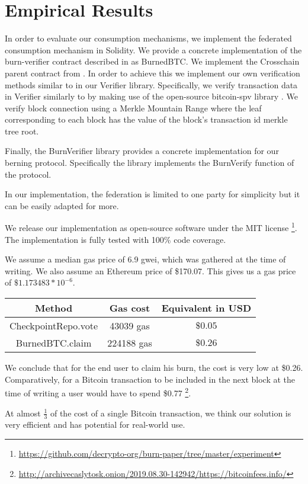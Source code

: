 \section{Empirical Results}

\newcommand{\rref}[1]{}

In order to evaluate our consumption mechanisms, we implement the federated consumption mechanism in Solidity. We provide a concrete implementation of the \textsf{burn-verifier} contract described in \rref{alg.burn-verifier} as \textsf{BurnedBTC}. We implement the \textsf{Crosschain} parent contract from \cite{pow-sidechains}. In order to achieve this we implement our own verification methods similar to \rref{alg.verify-event-federation} in our \textsf{Verifier} library. Specifically, we verify transaction data in \textsf{Verifier} similarly to \rref{alg.verify-tx} by making use of the open-source bitcoin-spv library \cite{bitcoin-spv-library}. We verify block connection using a Merkle Mountain Range where the leaf corresponding to each block has the value of the block's transaction id merkle tree root.

Finally, the \textsf{BurnVerifier} library provides a concrete implementation for our berning protocol. Specifically the library implements the \textsf{BurnVerify} function of the protocol.

In our implementation, the federation is limited to one party for simplicity but it can be easily adapted for more.

We release our implementation as open-source software under the MIT license
\footnote{\url{https://github.com/decrypto-org/burn-paper/tree/master/experiment}}.
The implementation is fully tested with 100\% code coverage.

We assume a median gas price of 6.9 gwei, which was gathered at the time of writing. We also assume an Ethereum price of \$170.07. This gives us a gas price of $\$1.173483 * 10^{-6}$.

\begin{center}
    \begin{tabular}{ |c|c|c| } 
     \hline
     Method & Gas cost & Equivalent in USD \\
     \hline
     \textsf{CheckpointRepo.vote} & 43039 gas & $\$0.05$ \\
     \textsf{BurnedBTC.claim} & 224188 gas & $\$0.26$ \\
     \hline
    \end{tabular}
\end{center}

We conclude that for the end user to claim his burn, the cost is very low at \$0.26. Comparatively, for a Bitcoin transaction to be included in the next block at the time of writing a user would have to spend \$0.77
\footnote{\url{http://archivecaslytosk.onion/2019.08.30-142942/https://bitcoinfees.info/}}.

At almost $\frac{1}{3}$ of the cost of a single Bitcoin transaction, we think our solution is very efficient and has potential for real-world use.